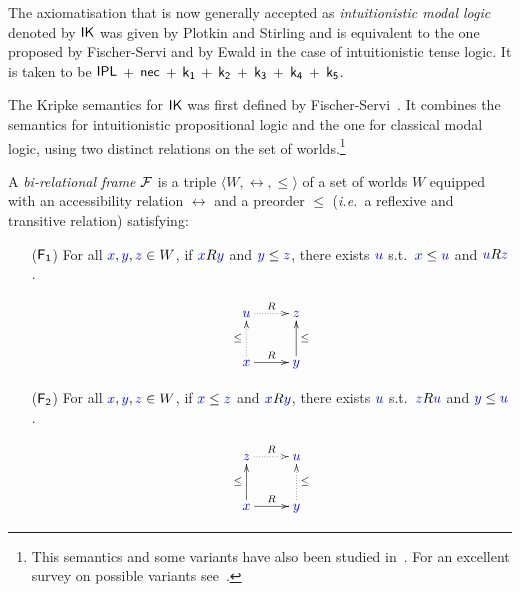 \documentclass[a4paper]{article}
\begin{document}
 The axiomatisation that is now generally accepted as \emph{intuitionistic modal logic} denoted by $\IK$ was given by Plotkin and Stirling \cite{plotkin:stirling:86} and is equivalent to the one proposed by Fischer-Servi \cite{fischer-servi:84} and by Ewald \cite{ewald:jsl86} in the case of intuitionistic tense logic. It is taken to be    $\rn{IPL}$ $\rn{+}$ $\rn{nec}$ $\rn{+}$ $\kax[1]$ $\rn{+}$ $\kax[2]$ $\rn{+}$ $\kax[3]$ $\rn{+}$ $\kax[4]$  $\rn{+}$ $\kax[5]$.
 
 
 The Kripke semantics for $\IK$ was first defined by Fischer-Servi~\cite{fischer-servi:84}.
 It combines the semantics for intuitionistic propositional logic and the one for classical modal logic, using two distinct relations on the set of worlds.\footnote{This semantics and some variants have also been studied in~\cite{bovzic1984models}. For an excellent survey on possible variants see~\cite{simpson:phd}.} 
 
 \begin{definition}
 	A \emph{bi-relational frame} $\F$ is a triple $\langle W, \rel, \le \rangle$ 
 	of a set of worlds $W$ equipped with an {accessibility relation} $\rel$ and a preorder $\le$ (\emph{i.e.}\ a reflexive and transitive relation) satisfying:
 	\begin{enumerate}
 		\item[($\rn{F_1}$)] For all $\lb x, \lb y, \lb z \in W$, if $\accs xy$ and $\futs yz$, there exists $\lb u$ s.t.~$\futs xu$ and $\accs uz$.
 		
 		\begin{equation*}
 			\xymatrix{
 				\lb u \ar@{.>}[r]^R  & \lb z \\
 				\lb x \ar@{.>}[u]^{\le} \ar@{->}[r]^R  & \lb y \ar@{->}[u]_{\le}
 			}
 		\end{equation*}
 		
 		\item[($\rn{F_2}$)] For all $\lb x, \lb y, \lb z \in W$, if $\futs xz$ and $\accs xy$, there exists $\lb u$ s.t.~$\accs zu$ and $\futs yu$.
 		
 		\begin{equation*}
 			\xymatrix{
 				\lb z\ar@{.>}[r]^R & \lb u \\
 				\lb x \ar@{->}[u]^{\le} \ar@{->}[r]^R & \lb y \ar@{.>}[u]_{\le}
 			}
 		\end{equation*}
 	\end{enumerate}
 \end{definition}
 
\end{document}
